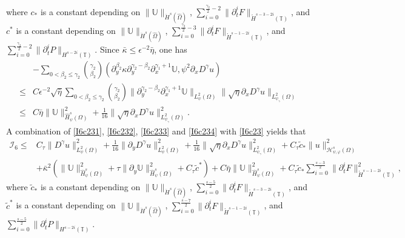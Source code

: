 \documentclass{amsart}
\numberwithin{equation}{section}
\begin{document}
where $c_{*}$ is a constant depending on $\|\mathbb{U}\|_{\ddot{H}^{s}(\hat{\Omega})}$,
$\sum\limits_{i=0}^{\frac{\gamma_{2}}{2}-2}\|\partial_{t}^{i}F\|_{\mathring{H}^{s-3-2i}(\mathbb{T})}$, and
$c^{*}$ is a constant depending on $\|\mathbb{U}\|_{\ddot{H}^{s}(\hat{\Omega})}$,
$\sum\limits_{i=0}^{\frac{\gamma_{2}}{2}-3}\|\partial_{t}^{i}F\|_{\mathring{H}^{s-1-2i}(\mathbb{T})}$,
and $\sum\limits_{i=0}^{\frac{\gamma_{2}}{2}-2}\|\partial_{t}^{i}P\|_{H^{s-2i}(\mathbb{T})}$.
Since $\bar{\kappa}\leq \epsilon^{-2}\bar{\eta}$, one has
\begin{align}\label{I6c234}
&-\sum_{0<\beta_{2}\leq\gamma_{2}}\binom{\gamma_{2}}{\beta_{2}}
   (\partial_{y}^{\beta_{2}}\kappa\partial_{y}^{\gamma_{2}-\beta_{2}}\partial_{x}^{\gamma_{1}+1}\mathbb{U},\psi^{2}\partial_{x}D^{\gamma}u)\\
\leq& C\epsilon^{-2}\sqrt{\bar{\eta}}\sum_{0<\beta_{2}\leq\gamma_{2}}\binom{\gamma_{2}}{\beta_{2}}
       \|\partial_{y}^{\gamma_{2}-\beta_{2}}\partial_{x}^{\gamma_{1}+1}\mathbb{U}\|_{L_{\psi}^{2}(\Omega)}
       \|\sqrt{\eta}\partial_{x}D^{\gamma}u\|_{L_{\psi_{\gamma}}^{2}(\Omega)}\nonumber\\
\leq& C\bar{\eta}\|\mathbb{U}\|_{\hat{H}_{\psi}^{s}(\Omega)}^{2}
     +\frac{1}{16}\|\sqrt{\eta}\partial_{x}D^{\gamma}u\|_{L_{\psi_{\gamma}}^{2}(\Omega)}^{2}.\nonumber
\end{align}
A combination of \eqref{I6c231}, \eqref{I6c232}, \eqref{I6c233} and \eqref{I6c234} with \eqref{I6c23} yields that
\begin{align}\label{I6c23'}
\mathcal{I}_{6}
\leq& C_{\tau}\|D^{\gamma}u\|_{L_{\psi}^{2}(\Omega)}^{2}
     +\frac{1}{16}\|\partial_{y}D^{\gamma}u\|_{L_{\psi}^{2}(\Omega)}^{2}
     +\frac{1}{16}\|\sqrt{\eta}\partial_{x}D^{\gamma}u\|_{L_{\psi_{\gamma}}^{2}(\Omega)}^{2}
     +C_{\tau}\tilde{c}_{*}\|u\|_{\mathcal{H}_{\psi,\varphi}^{s}(\Omega)}^{2}\\
    &+\bar{\kappa}^{2}\left(\|\mathbb{U}\|_{\hat{H}_{\psi}^{s}(\Omega)}^{2}
                +\tau\|\partial_{y}\mathbb{U}\|_{\hat{H}_{\psi}^{s}(\Omega)}^{2}+C_{\tau}\tilde{c}^{*}\right)
     +C\bar{\eta}\|\mathbb{U}\|_{\hat{H}_{\psi}^{s}(\Omega)}^{2}
     +C_{\tau}\tilde{c}_{*}\sum_{i=0}^{\frac{s-3}{2}}\|\partial_{t}^{i}F\|_{\mathring{H}^{s-1-2i}(\mathbb{T})}^{2},\nonumber
\end{align}
where $\tilde{c}_{*}$ is a constant depending on $\|\mathbb{U}\|_{\ddot{H}^{s}(\hat{\Omega})}$,
$\sum\limits_{i=0}^{\frac{s-5}{2}}\|\partial_{t}^{i}F\|_{\mathring{H}^{s-3-2i}(\mathbb{T})}$,
and $\tilde{c}^{*}$ is a constant depending on $\|\mathbb{U}\|_{\ddot{H}^{s}(\hat{\Omega})}$,
$\sum\limits_{i=0}^{\frac{s-7}{2}}\|\partial_{t}^{i}F\|_{\mathring{H}^{s-1-2i}(\mathbb{T})}$,
and $\sum\limits_{i=0}^{\frac{s-5}{2}}\|\partial_{t}^{i}P\|_{H^{s-2i}(\mathbb{T})}$.
\end{document}
